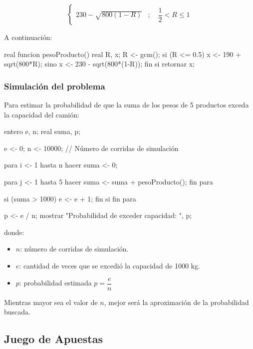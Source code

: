 \documentclass{article}
\begin{document}
\begin{description}
\[\begin{cases}
    230-\sqrt{800(1-R)}
    &
    ;\quad \dfrac{1}{2}< R\le 1
    \end{cases}
    \]
    
    \item[Paso 5: Propuesta algorítmica para la variable aleatoria]
    
    A continuación:
    
    \begin{Algoritmo}{}
real funcion pesoProducto()
{
    real R, x;
    R <- gcm();
    si (R <= 0.5)
        x <- 190 + sqrt(800*R);
    sino
        x <- 230 - sqrt(800*(1-R));
    fin si
    retornar x;
}
    \end{Algoritmo}
\end{description}

\subsubsection{Simulación del problema}

Para estimar la probabilidad de que la suma de los pesos de 5 productos exceda la capacidad del camión:

\begin{Algoritmo}{}
entero e, n;
real suma, p;

e <- 0;
n <- 10000;  // Número de corridas de simulación

para i <- 1 hasta n hacer
    suma <- 0;
    
    para j <- 1 hasta 5 hacer
        suma <- suma + pesoProducto();
    fin para
    
    si (suma > 1000)
        e <- e + 1;
    fin si
fin para

p <- e / n;
mostrar "Probabilidad de exceder capacidad: ", p;
\end{Algoritmo}

donde:
\begin{itemize}
    \item $n$: número de corridas de simulación.
    \item $e$: cantidad de veces que se excedió la capacidad de 1000 kg.
    \item $p$: probabilidad estimada $p=\dfrac{e}{n}$
\end{itemize}

Mientras mayor sea el valor de $n$, mejor será la aproximación de la probabilidad buscada.

\subsection{Juego de Apuestas}
\end{document}
